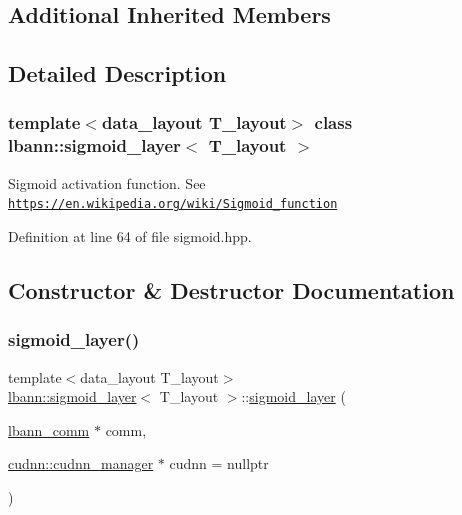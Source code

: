 \subsection*{Additional Inherited Members}


\subsection{Detailed Description}
\subsubsection*{template$<$data\+\_\+layout T\+\_\+layout$>$\newline
class lbann\+::sigmoid\+\_\+layer$<$ T\+\_\+layout $>$}

Sigmoid activation function. See \href{https://en.wikipedia.org/wiki/Sigmoid_function}{\tt https\+://en.\+wikipedia.\+org/wiki/\+Sigmoid\+\_\+function} 

Definition at line 64 of file sigmoid.\+hpp.



\subsection{Constructor \& Destructor Documentation}
\mbox{\label{classlbann_1_1sigmoid__layer_a7e9b873bf8d5c89ad66b7500d3c3f05f}} 
\subsubsection{\texorpdfstring{sigmoid\+\_\+layer()}{sigmoid\_layer()}}
{\footnotesize\ttfamily template$<$data\+\_\+layout T\+\_\+layout$>$ \\
\hyperlink{classlbann_1_1sigmoid__layer}{lbann\+::sigmoid\+\_\+layer}$<$ T\+\_\+layout $>$\+::\hyperlink{classlbann_1_1sigmoid__layer}{sigmoid\+\_\+layer} (\begin{DoxyParamCaption}\item[{\hyperlink{classlbann_1_1lbann__comm}{lbann\+\_\+comm} $\ast$}]{comm,  }\item[{\hyperlink{classlbann_1_1cudnn_1_1cudnn__manager}{cudnn\+::cudnn\+\_\+manager} $\ast$}]{cudnn = {\ttfamily nullptr} }\end{DoxyParamCaption})\hspace{0.3cm}{\ttfamily [inline]}}



